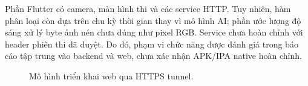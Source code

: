 Phần Flutter có camera, màn hình thi và các service HTTP. Tuy nhiên, hàm phân loại còn dựa trên chu kỳ thời gian thay vì mô hình AI; phần ước lượng độ sáng xử lý byte ảnh nén chưa đúng như pixel RGB. Service chưa hoàn chỉnh với header phiên thi đã duyệt. Do đó, phạm vi chức năng được đánh giá trong báo cáo tập trung vào backend và web, chưa xác nhận APK/IPA native hoàn chỉnh.
\begin{figure}[H]\centering
\caption{Mô hình triển khai web qua HTTPS tunnel.}\end{figure}
